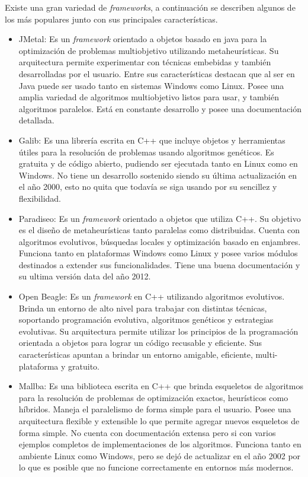 Existe una gran variedad de \emph{frameworks}, a continuación se describen algunos de los más populares junto con sus principales características.

\begin{itemize}
	\item JMetal: Es un \emph{framework} orientado a objetos basado en java para la optimización de problemas multiobjetivo utilizando metaheurísticas. Su arquitectura permite experimentar con técnicas embebidas y también desarrolladas por el usuario. Entre sus características destacan que al ser en Java puede ser usado tanto en sistemas Windows como Linux. Posee una amplia variedad de algoritmos multiobjetivo listos para usar, y también algoritmos paralelos. Está en constante desarrollo y posee una documentación detallada. \citep{Jmetal}
	
	\item Galib: Es una librería escrita en C++ que incluye objetos y herramientas útiles para la resolución de problemas usando algoritmos genéticos. Es gratuita y de código abierto, pudiendo ser ejecutada tanto en Linux como en Windows. No tiene un desarrollo sostenido siendo su última actualización en el año 2000, esto no quita que todavía se siga usando por su sencillez y flexibilidad. \citep{Galib}
	
	\item Paradiseo: Es un \emph{framework} orientado a objetos que utiliza C++. Su objetivo es el diseño de metaheurísticas tanto paralelas como distribuidas. Cuenta con algoritmos evolutivos, búsquedas locales y optimización basado en enjambres. Funciona tanto en plataformas Windows como Linux y posee varios módulos destinados a extender sus funcionalidades. Tiene una buena documentación y su ultima versión data del año 2012. \citep{Paradiseo}
	
	\item Open Beagle: Es un \emph{framework} en C++ utilizando algoritmos evolutivos. Brinda un entorno de alto nivel para trabajar con distintas técnicas, soportando programación evolutiva, algoritmos genéticos y estrategias evolutivas. Su arquitectura permite utilizar los principios de la programación orientada a objetos para lograr un código recusable y eficiente. Sus características apuntan a brindar un entorno amigable, eficiente, multi-plataforma y gratuito. \citep{OpenBeagle}
	
	\item Mallba: Es una biblioteca escrita en C++ que brinda esqueletos de algoritmos para la resolución de problemas de optimización exactos, heurísticos como híbridos. Maneja el paralelismo de forma simple para el usuario. Posee una arquitectura flexible y extensible lo que permite agregar nuevos esqueletos de forma simple. No cuenta con documentación extensa pero si con varios ejemplos completos de implementaciones de los algoritmos. Funciona tanto en ambiente Linux como Windows, pero se dejó de actualizar en el año 2002 por lo que es posible que no funcione correctamente en entornos más modernos. \citep{Mallba}
	

\end{itemize}
